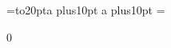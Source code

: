 
\startTEXpage[offset=1ts,width=3em] %
    =\hbox to20pt{a\hskip0pt plus10pt a\hskip0pt plus10pt}
    =

     0 %

\stopTEXpage
